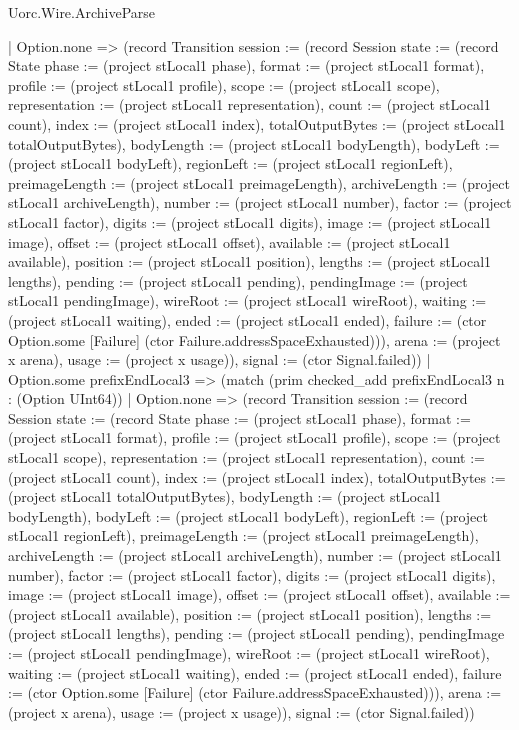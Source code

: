 \begin{lexlean}{Uorc.Wire.ArchiveParse}
\begin{semanticmodule}
{      | Option.none => (record Transition {session := (record Session {state := (record State {phase := (project stLocal1 phase), format := (project stLocal1 format), profile := (project stLocal1 profile), scope := (project stLocal1 scope), representation := (project stLocal1 representation), count := (project stLocal1 count), index := (project stLocal1 index), totalOutputBytes := (project stLocal1 totalOutputBytes), bodyLength := (project stLocal1 bodyLength), bodyLeft := (project stLocal1 bodyLeft), regionLeft := (project stLocal1 regionLeft), preimageLength := (project stLocal1 preimageLength), archiveLength := (project stLocal1 archiveLength), number := (project stLocal1 number), factor := (project stLocal1 factor), digits := (project stLocal1 digits), image := (project stLocal1 image), offset := (project stLocal1 offset), available := (project stLocal1 available), position := (project stLocal1 position), lengths := (project stLocal1 lengths), pending := (project stLocal1 pending), pendingImage := (project stLocal1 pendingImage), wireRoot := (project stLocal1 wireRoot), waiting := (project stLocal1 waiting), ended := (project stLocal1 ended), failure := (ctor Option.some [Failure] (ctor Failure.addressSpaceExhausted))}), arena := (project x arena), usage := (project x usage)}), signal := (ctor Signal.failed)})
      | Option.some prefixEndLocal3 => (match (prim checked_add prefixEndLocal3 n : (Option UInt64))
        | Option.none => (record Transition {session := (record Session {state := (record State {phase := (project stLocal1 phase), format := (project stLocal1 format), profile := (project stLocal1 profile), scope := (project stLocal1 scope), representation := (project stLocal1 representation), count := (project stLocal1 count), index := (project stLocal1 index), totalOutputBytes := (project stLocal1 totalOutputBytes), bodyLength := (project stLocal1 bodyLength), bodyLeft := (project stLocal1 bodyLeft), regionLeft := (project stLocal1 regionLeft), preimageLength := (project stLocal1 preimageLength), archiveLength := (project stLocal1 archiveLength), number := (project stLocal1 number), factor := (project stLocal1 factor), digits := (project stLocal1 digits), image := (project stLocal1 image), offset := (project stLocal1 offset), available := (project stLocal1 available), position := (project stLocal1 position), lengths := (project stLocal1 lengths), pending := (project stLocal1 pending), pendingImage := (project stLocal1 pendingImage), wireRoot := (project stLocal1 wireRoot), waiting := (project stLocal1 waiting), ended := (project stLocal1 ended), failure := (ctor Option.some [Failure] (ctor Failure.addressSpaceExhausted))}), arena := (project x arena), usage := (project x usage)}), signal := (ctor Signal.failed)})
}
\end{semanticmodule}
\end{lexlean}
